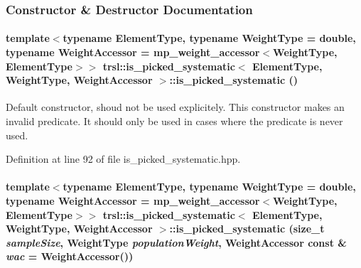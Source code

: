 \subsubsection{Constructor \& Destructor Documentation}
\hypertarget{classtrsl_1_1is__picked__systematic_a6e812d5651e0ee441f508c0ab88c692d}{
\paragraph[{is\_\-picked\_\-systematic}]{\setlength{\rightskip}{0pt plus 5cm}template$<$typename ElementType, typename WeightType = double, typename WeightAccessor = mp\_\-weight\_\-accessor$<$WeightType, ElementType$>$$>$ {\bf trsl::is\_\-picked\_\-systematic}$<$ ElementType, WeightType, WeightAccessor $>$::{\bf is\_\-picked\_\-systematic} ()}\hfill}
\label{classtrsl_1_1is__picked__systematic_a6e812d5651e0ee441f508c0ab88c692d}


Default constructor, shoud not be used explicitely. This constructor makes an invalid predicate. It should only be used in cases where the predicate is never used. 

Definition at line 92 of file is\_\-picked\_\-systematic.hpp.\hypertarget{classtrsl_1_1is__picked__systematic_a74577120b2a697ad3a91f538a844b055}{
\paragraph[{is\_\-picked\_\-systematic}]{\setlength{\rightskip}{0pt plus 5cm}template$<$typename ElementType, typename WeightType = double, typename WeightAccessor = mp\_\-weight\_\-accessor$<$WeightType, ElementType$>$$>$ {\bf trsl::is\_\-picked\_\-systematic}$<$ ElementType, WeightType, WeightAccessor $>$::{\bf is\_\-picked\_\-systematic} (size\_\-t {\em sampleSize}, \/  WeightType {\em populationWeight}, \/  WeightAccessor const \& {\em wac} = {\ttfamily WeightAccessor()})}\hfill}
\label{classtrsl_1_1is__picked__systematic_a74577120b2a697ad3a91f538a844b055}


